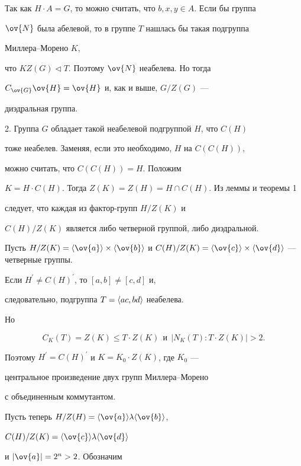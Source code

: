 Так как $H\cdot A=G$, то можно считать, что $b,x,y\in A$. Если бы группа


$\ov{N}$ была абелевой, то в группе $T$ нашлась бы такая подгруппа


Миллера--Морено $K$,


что $KZ(G)\triangleleft T$. Поэтому $\ov{N}$ неабелева. Но тогда


$C_{\ov{G}}\ov{H}=\ov{H}$ и, как и выше, $G/Z(G)$ ---


диэдральная группа.


\smallskip





2. Группа $G$ обладает такой неабелевой подгруппой $H$, что $C(H)$


тоже неабелев. Заменяя, если это необходимо, $H$ на $C(C(H))$, 


можно считать, что $C(C(H))=H$. Положим


$K=H\cdot C(H)$. Тогда $Z(K)=Z(H)=H\cap C(H)$. Из леммы и теоремы 1


следует, что каждая из фактор-групп $H/Z(K)$ и


$C(H)/Z(K)$ является либо четверной группой, либо диэдральной.





Пусть $H/Z(K)=\ls\ov{a}\ps\times\ls\ov{b}\ps$ и $C(H)/Z(K)=


\ls\ov{c}\ps\times\ls\ov{d}\ps$ --- четверные группы.


Если $H^\prime\ne C(H)^\prime$, то $[a,b]\ne [c,d]$ и, 


следовательно, подгруппа $T=\langle ac, bd\rangle$ неабелева.


Но


$$


C_K(T)=Z(K)\le T\! \cdot\! Z(K)\ \ \text{и}\ \ |N_K(T):T\! \cdot\! Z(K)|>2.


$$


Поэтому $H^\prime=C(H)^\prime$ и $K=K_0\cdot Z(K)$, где $K_0$ ---


центральное произведение двух групп Миллера--Морено 


с объединенным коммутантом.





Пусть теперь $H/Z(H)=\ls\ov{a}\ps\lambda\ls\ov{b}\ps$,


$C(H)/Z(K)=\ls\ov{c}\ps\lambda\ls\ov{d}\ps$


и $|\ov{a}|=2^n>2$. Обозначим


